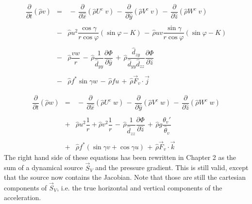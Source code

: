 \begin{eqnarray}
\dfrac{\partial}{\partial t}(\widehat{\rho}  v ) &= &
 \, - \, \dfrac{\partial }{\partial \widehat{x}} (\widehat{\rho} U^{c }\;    v )
 \, - \, \dfrac{\partial }{\partial \widehat{y}} (\widehat{\rho} V^{c }\;    v )
 \, - \, \dfrac{\partial }{\partial \widehat{z}} (\widehat{\rho} W^{c } \;    v )
\nonumber \\ & & \nonumber \\
&  - & \widehat{\rho}  u ^{2}  \dfrac{ \cos\gamma}{r\cos\varphi} (\sin\varphi -K)
 \, - \, \widehat{\rho}  u   v \dfrac{\sin\gamma}{r\cos\varphi} (\sin\varphi -K)
\nonumber \\ & & \nonumber \\
 & - & \widehat{\rho}\dfrac{ v  w}{r} \,  - \, \widehat{\rho}\dfrac{1}{\widehat{d}_{yy}} \dfrac{\partial \Phi}{\partial \widehat{y}}
 \, +  \, \widehat{\rho}\dfrac{\widehat{d}_{zy}}{\widehat{d}_{yy}\widehat{d}_{zz}} \dfrac{\partial \Phi}{\partial \widehat{z}} \nonumber \\
& & \nonumber \\
&  - & \widehat{\rho} f^{*} \sin\gamma w  \, - \,  \widehat{\rho} f  u
 \,+ \, \widehat{\rho} \vec{F}_{v} \cdot\vec{j}
\end{eqnarray}


\begin{eqnarray}
\dfrac{\partial}{\partial t}(\widehat{\rho} w) &= &
 \, - \, \dfrac{\partial }{\partial \widehat{x}} (\widehat{\rho} U^{c } \;   w)
 \, - \, \dfrac{\partial }{\partial \widehat{y}} (\widehat{\rho} V^{c } \;   w )
 \, - \, \dfrac{\partial }{\partial \widehat{z}} (\widehat{\rho} W^{c } \;   w)
\nonumber \\ & & \nonumber \\
 & + & \widehat{\rho} u ^{2} \dfrac{1}{r}+
\widehat{\rho}  v ^{2}\dfrac{1}{r}
 \,  - \, \widehat{\rho}\dfrac{1}{\widehat{d}_{zz}} \dfrac{\partial \Phi}{\partial \widehat{z}}
\, + \,\widehat{\rho} g \dfrac{\theta_v ' }{\widehat{\theta}_v}\nonumber \\
& & \nonumber \\
&  + & \widehat{\rho} f^{*}(\sin\gamma  v  + \cos\gamma  u )
 \,+ \, \widehat{\rho} \vec{F}_{v} \cdot \vec{k}
\end{eqnarray}
The right hand side of these equations has been rewritten in Chapter 2 as
the sum of a dynamical source $\vec{S}_V$ and the pressure gradient. This
is still valid, except that the source now contains the Jacobian. Note
that those are still the cartesian components of $\vec{S}_V$,
i.e. the true horizontal and vertical components of the acceleration.

